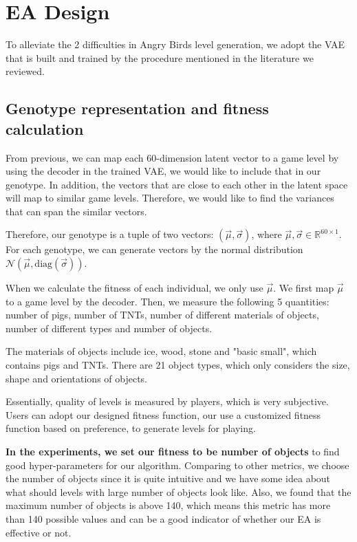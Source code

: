 \documentclass[manuscript,screen,review]{acmart}
\begin{document}
\section{EA Design}

To alleviate the 2 difficulties in Angry Birds level generation, we adopt the VAE that is built and trained by the procedure mentioned in the literature we reviewed.

\subsection{Genotype representation and fitness calculation}

From previous, we can map each 60-dimension latent vector to a game level by using the decoder in the trained VAE, we would like to include that in our genotype. In addition, the vectors that are close to each other in the latent space will map to similar game levels. Therefore, we would like to find the variances that can span the similar vectors.

Therefore, our genotype is a tuple of two vectors: $(\vec{\mu}, \vec{\sigma})$, where $\vec{\mu}, \vec{\sigma}\in\mathbb{R}^{60\times 1}$. For each genotype, we can generate vectors by the normal distribution $\mathcal{N}(\vec{\mu},\mathrm{diag}(\vec{\sigma}))$.

When we calculate the fitness of each individual, we only use $\vec{\mu}$. We first map $\vec{\mu}$ to a game level by the decoder. Then, we measure the following 5 quantities: number of pigs, number of TNTs, number of different materials of objects, number of different types and number of objects.

\indent\indent The materials of objects include ice, wood, stone and "basic small", which contains pigs and TNTs. There are 21 object types, which only considers the size, shape and orientations of objects.

Essentially, quality of levels is measured by players, which is very subjective. Users can adopt our designed fitness function, our use a customized fitness function based on preference, to generate levels for playing.

\textbf{In the experiments, we set our fitness to be number of objects} to find good hyper-parameters for our algorithm. Comparing to other metrics, we choose the number of objects since it is quite intuitive and we have some idea about what should levels with large number of objects look like. Also, we found that the maximum number of objects is above 140, which means this metric has more than 140 possible values and can be a good indicator of whether our EA is effective or not. 
\end{document}
